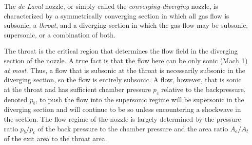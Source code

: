 \documentclass[11pt,dvipsnames]{thesis}
\begin{document}
The \textit{de Laval} nozzle, or simply called the \textit{converging-diverging} nozzle, is characterized by a symmetrically converging section in which all gas flow is subsonic, a \textit{throat}, and a diverging section in which the gas flow may be subsonic, supersonic, or a combination of both.

The throat is the critical region that determines the flow field in the diverging section of the nozzle. A true fact is that the flow here can be only sonic (Mach 1) \textit{at most}. Thus, a flow that is subsonic at the throat is necessarily subsonic in the diverging section, so the flow is entirely subsonic. A flow, however, that is sonic at the throat and has sufficient chamber pressure $p_c$ relative to the backpressure, denoted $p_b$, to push the flow into the supersonic regime will be supersonic in the diverging section and will continue to be so unless encountering a shockwave in the section.
%
The flow regime of the nozzle is largely determined by the pressure ratio $p_b / p_c$ of the back pressure to the chamber pressure and the area ratio $A_e / A_t$ of the exit area to the throat area.
\end{document}

